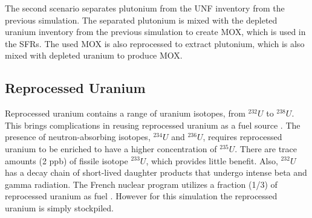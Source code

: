 The second scenario separates plutonium from the \gls{UNF}
inventory from the previous simulation. The separated
plutonium is mixed with the depleted uranium inventory from the previous simulation
to create \gls{MOX}, which is used in the \gls{SFR}s. The used
\gls{MOX} is also reprocessed to extract plutonium, which is also
mixed with depleted uranium to produce \gls{MOX}.



\subsection{Reprocessed Uranium}
Reprocessed uranium contains a range of uranium isotopes, from $^{232}U$ to $^{238}U$.
This brings complications in reusing reprocessed uranium as a fuel source \cite{IAEA_management_2007}.
The presence of neutron-absorbing isotopes, $^{234}U$ and $^{236}U$, requires reprocessed uranium
to be enriched to have a higher concentration of $^{235}U$. There are trace amounts (2 ppb) 
of fissile isotope $^{233}U$, which provides little benefit.  
Also, $^{232}U$ has a decay chain of short-lived
daughter products that undergo intense beta and gamma radiation.
The French nuclear program utilizes a fraction (1/3) of reprocessed uranium as fuel \cite{IAEA_management_2007}.
However for this simulation the reprocessed uranium is simply stockpiled.


